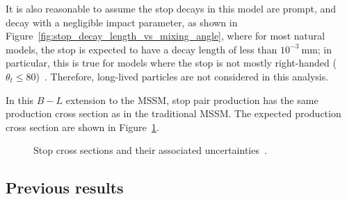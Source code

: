 It is also reasonable to assume the stop decays in this model are prompt, and
decay with a negligible impact parameter, as shown in
Figure~\ref{fig:stop_decay_length_vs_mixing_angle}, where for most natural
models, the stop is expected to have a decay length of less than
$10^{-3}~\mathrm{mm}$;
in particular, this is true for models where the stop is not mostly
right-handed ($\theta_t \leq 80$)~\cite{Marshall:2014cwa,Marshall:2014kea}.
Therefore, long-lived particles are not considered in this analysis.

In this $B-L$ extension to the MSSM, stop pair production has the same
production cross section as in the traditional MSSM.
The expected production cross section are shown in Figure~\ref{fig:stop_xsec}.

\begin{figure}[ht]
  \caption{
    Stop cross sections and their associated
    uncertainties~\cite{Beenakker:1997ut,Beenakker:2010nq,Beenakker:2011fu}.
  }
  \label{fig:stop_xsec}
\end{figure}

\FloatBarrier
\subsection{Previous results}

